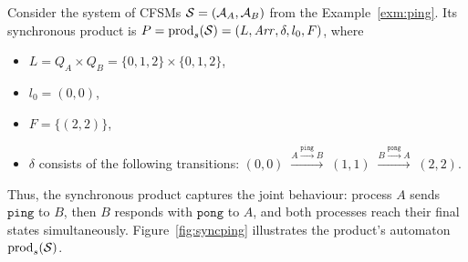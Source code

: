 \begin{example}\label{exm:syncping}
Consider the system of CFSMs $\mathcal{S} = (\mathcal{A}_A, \mathcal{A}_B)$ 
from the Example~\ref{exm:ping}. Its synchronous product is 
$P = \mathrm{prod}_s(\mathcal{S}) = (L, \mathit{Arr}, \delta, l_0, F)$,
where
\begin{itemize}
  \item $L = Q_A \times Q_B = \{0,1,2\} \times \{0,1,2\}$,
  \item $l_0 = (0,0)$,
  \item $F = \{(2,2)\}$,
  \item $\delta$ consists of the following transitions:
  $(0,0) \;\xrightarrow{A \xrightarrow{\texttt{ping}} B}\; (1,1)
  \;\xrightarrow{B \xrightarrow{\texttt{pong}} A}\; (2,2)$.
\end{itemize}
Thus, the synchronous product captures the joint behaviour: process $A$ 
sends $\texttt{ping}$ to $B$, then $B$ responds with $\texttt{pong}$ 
to $A$, and both processes reach their final states simultaneously.
Figure~\ref{fig:syncping} illustrates the product's automaton 
$\mathrm{prod}_s(\mathcal{S})$.


\end{example}
